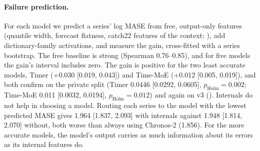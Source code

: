 \paragraph{Failure prediction.} For each model we predict a series' log MASE from
free, output-only features (quantile width, forecast flatness, catch22 features of the context;
\citealp{lubba2019catch22}), add dictionary-family activations, and measure the gain, cross-fitted with a series
bootstrap. The free baseline is strong (Spearman 0.76--0.85), and for five models the gain's interval includes zero. The
gain is positive for the two least accurate models, Timer (+0.030 [0.019, 0.043]) and Time-MoE (+0.012 [0.005,
0.019]), and both confirm on the private split (Timer 0.0446 [0.0292, 0.0605], $p_{\text{Holm}}=0.002$; Time-MoE 0.011
[0.0032, 0.0194], $p_{\text{Holm}}=0.012$) and again on v3 (). Internals do not help in choosing a model. Routing
each series to the model with the lowest predicted MASE gives 1.964 [1.837, 2.093] with internals against 1.948 [1.814,
2.070] without, both worse than always using Chronos-2 (1.856). For the more accurate models, the
model's output carries as much information about its errors as its internal features do.
